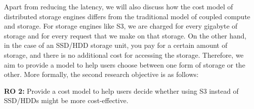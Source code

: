 \medskip
Apart from reducing the latency, we will also discuss how the cost model of
distributed storage engines differs from the traditional model of coupled
compute and storage. For storage engines like S3, we are charged for every
gigabyte of storage and for every request that we make on that
storage. On the other hand, in the case of an SSD/HDD storage unit, you pay for a
certain amount of storage, and there is no additional cost for accessing the
storage. Therefore, we aim to provide a model to help users choose between one
form of storage or the other. More formally, the second research objective is
as follows:
\begin{displayquote}
    \textbf{RO 2:} Provide a cost model to help users decide whether using S3
    instead of SSD/HDDs might be more cost-effective.
\end{displayquote}


